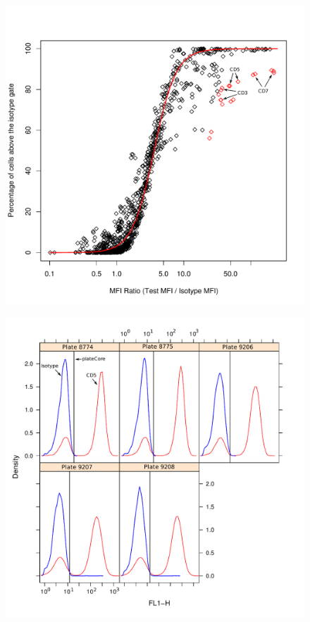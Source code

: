 \documentclass[12pt]{article}
\begin{document}
\begin{figure}
\centering
\includegraphics{mfiRatioB.pdf}
\caption{}
\label{fig:mfiRatio}
\end{figure}

\begin{figure}
\centering
\includegraphics{mfiRatio2.pdf}
\caption{}
\label{fig:mfiRatio3}
\end{figure}
\end{document}
